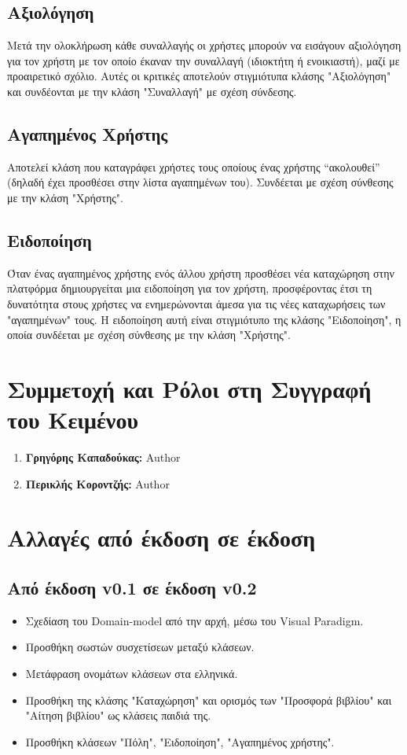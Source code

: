 \documentclass[12pt,a4paper]{article}
\begin{document}
\subsection{Αξιολόγηση}
Μετά την ολοκλήρωση κάθε συναλλαγής οι χρήστες μπορούν να εισάγουν αξιολόγηση για τον χρήστη με τον οποίο έκαναν την συναλλαγή (ιδιοκτήτη ή ενοικιαστή), μαζί με προαιρετικό σχόλιο. Αυτές οι κριτικές αποτελούν στιγμιότυπα κλάσης "Αξιολόγηση" και συνδέονται με την κλάση "Συναλλαγή" με σχέση σύνδεσης.


\subsection{Αγαπημένος Χρήστης}
Αποτελεί κλάση που καταγράφει χρήστες τους οποίους ένας χρήστης “ακολουθεί” (δηλαδή έχει προσθέσει στην λίστα αγαπημένων του). Συνδέεται με σχέση σύνθεσης με την κλάση "Χρήστης".

\subsection{Ειδοποίηση}
Όταν ένας αγαπημένος χρήστης ενός άλλου χρήστη προσθέσει νέα καταχώρηση στην πλατφόρμα δημιουργείται μια ειδοποίηση για τον χρήστη, προσφέροντας έτσι τη δυνατότητα στους χρήστες να ενημερώνονται άμεσα για τις νέες καταχωρήσεις των "αγαπημένων" τους. Η ειδοποίηση αυτή είναι στιγμιότυπο της κλάσης "Ειδοποίηση", η οποία συνδέεται με σχέση σύνθεσης με την κλάση "Χρήστης".

\section{Συμμετοχή και Ρόλοι στη Συγγραφή του Κειμένου}
\begin{enumerate}
	\item \textbf{Γρηγόρης Καπαδούκας:} Author
	\item \textbf{Περικλής Κοροντζής:} Author
\end{enumerate}

\section{Αλλαγές από έκδοση σε έκδοση}

\subsection{Από έκδοση v0.1 σε έκδοση v0.2}
\begin{itemize}
    \item Σχεδίαση του Domain-model από την αρχή, μέσω του Visual Paradigm.
    \item Προσθήκη σωστών συσχετίσεων μεταξύ κλάσεων.
    \item Μετάφραση ονομάτων κλάσεων στα ελληνικά.
    \item Προσθήκη της κλάσης "Καταχώρηση" και ορισμός των "Προσφορά βιβλίου" και "Αίτηση βιβλίου" ως κλάσεις παιδιά της.
    \item Προσθήκη κλάσεων "Πόλη", "Ειδοποίηση", "Αγαπημένος χρήστης".
\end{itemize}
\end{document}
